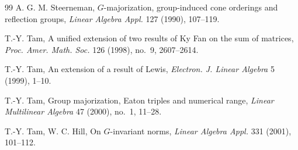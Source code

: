 \documentclass[11pt]{amsart}
\theoremstyle{plain}
\theoremstyle{definition}
\theoremstyle{remark}
\begin{document}
\begin{thebibliography}{99}
 A. G. M. Steerneman, $G$-majorization, group-induced cone orderings and reflection groups, \emph{Linear Algebra Appl.} 127 (1990), 107--119.

 T.-Y. Tam, A unified extension of two results of Ky Fan on the sum of matrices, \emph{Proc. Amer. Math. Soc.} 126 (1998), no.~9, 2607--2614.

 T.-Y. Tam, An extension of a result of Lewis, \emph{Electron. J. Linear Algebra} 5 (1999), 1--10.

 T.-Y. Tam, Group majorization, Eaton triples and numerical range, \emph{Linear Multilinear Algebra} 47 (2000), no.~1, 11--28.

 T.-Y. Tam, W. C. Hill, On $G$-invariant norms, \emph{Linear Algebra Appl.} 331 (2001), 101--112.

\end{thebibliography}
\end{document}
